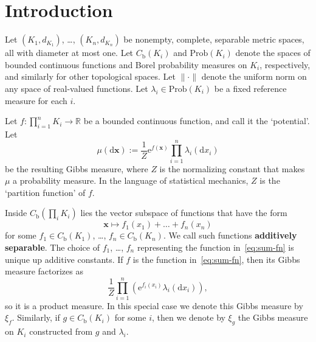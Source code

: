 \documentclass[aop,preprint]{imsart}
\theoremstyle{remark}
\renewcommand{\bf}[1]{\boldsymbol{#1}}
\renewcommand{\rm}[1]{\mathrm{#1}}
\newcommand{\bbR}{\mathbb{R}}
\newcommand{\rmb}{\mathrm{b}}
\renewcommand{\d}{\mathrm{d}}
\newcommand{\rme}{\mathrm{e}}
\renewcommand{\l}{\lambda}
\renewcommand{\to}{\longrightarrow}
\renewcommand{\Pr}{\rm{Prob}}
\begin{document}
\begin{frontmatter}

\begin{keyword}[class=MSC]
\end{keyword}

\begin{keyword}
\end{keyword}

\end{frontmatter}


\thispagestyle{plain}

\section{Introduction}

Let $(K_1,d_{K_1})$, \dots, $(K_n,d_{K_n})$ be nonempty, complete, separable metric spaces, all with diameter at most one.  Let $C_\rm{b}(K_i)$ and $\Pr(K_i)$ denote the spaces of bounded continuous functions and Borel probability measures on $K_i$, respectively, and similarly for other topological spaces.  Let $\|\cdot\|$ denote the uniform norm on any space of real-valued functions.  Let $\l_i \in \Pr(K_i)$ be a fixed reference measure for each $i$. %

Let $f:\prod_{i=1}^n K_i \to \bbR$ be a bounded continuous function, and call it the `potential'.  Let
\begin{equation}\label{eq:Gibbs-main}
\mu(\d\bf{x}) := \frac{1}{Z}\rme^{f(\bf{x})}\prod_{i=1}^n\l_i(\d x_i)
\end{equation}
be the resulting Gibbs measure, where $Z$ is the normalizing constant that makes $\mu$ a probability measure.  In the language of statistical mechanics, $Z$ is the `partition function' of $f$.

Inside $C_\rmb(\prod_i K_i)$ lies the vector subspace of functions that have the form
\begin{equation}\label{eq:sum-fn}
\bf{x} \mapsto f_1(x_1) + \dots + f_n(x_n)
\end{equation}
for some $f_1 \in C_\rmb(K_1)$, \dots, $f_n \in C_\rmb(K_n)$.  We call such functions \textbf{additively separable}.  The choice of $f_1$, \dots, $f_n$ representing the function in~\eqref{eq:sum-fn} is unique up additive constants.  If $f$ is the function in~\eqref{eq:sum-fn}, then its Gibbs measure factorizes as
\[\frac{1}{Z}\prod_{i=1}^n (\rme^{f_i(x_i)}\l_i(\d x_i)),\]
so it is a product measure.  In this special case we denote this Gibbs measure by $\xi_f$.  Similarly, if $g \in C_\rmb(K_i)$ for some $i$, then we denote by $\xi_g$ the Gibbs measure on $K_i$ constructed from $g$ and $\l_i$.
\end{document}
